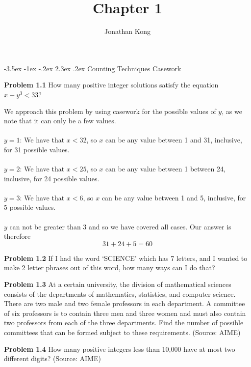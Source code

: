 \documentclass[11pt]{scrartcl}
\title{\normalfont\notesize\textbf{Chapter 1}}
\author{Jonathan Kong}
\date{}
\makeatletter
\renewcommand\section{\@startsection{section}{1}{\z@}%
                                   {-3.5ex \@plus -1ex \@minus -.2ex}%
                                   {2.3ex \@plus.2ex}%
                                   {\normalfont\large\bfseries}}
\makeatother
\begin{document}
\maketitle
\section{Counting Techniques}
Casework
\begin{tcolorbox}
\textbf{Problem 1.1} How many positive integer solutions satisfy the equation {$x+y^3<33$}?
\end{tcolorbox}
\noindent 
We approach this problem by using casework for the possible values of $y$, as we note that it can only be a few values. \\
\\
\noindent 
$y=1$: We have that $x<32$, so $x$ can be any value between 1 and 31, inclusive, for 31 possible values. \\
\\
\noindent 
$y=2$: We have that $x<25$, so $x$ can be any value between 1 between 24, inclusive, for 24 possible values. \\
\\
\noindent 
$y=3$: We have that $x<6$, so $x$ can be any value between 1 and 5, inclusive, for 5 possible values. \\
\\
\noindent 
$y$ can not be greater than 3 and so we have covered all cases. Our answer is therefore 
$$31+24+5=60$$
\begin{tcolorbox}
\textbf{Problem 1.2} If I had the word ‘SCIENCE’ which has 7 letters, and I wanted to make 2 letter phrases out of this word, how many ways can I do that? 
\end{tcolorbox}
\begin{tcolorbox}
\textbf{Problem 1.3} At a certain university, the division of mathematical sciences consists of the departments of mathematics, statistics, and computer science. There are two male and two female professors in each department. A committee of six professors is to contain three men and three women and must also contain two professors from each of the three departments. Find the number of possible committees that can be formed subject to these requirements. (Source: AIME)
\end{tcolorbox}
\begin{tcolorbox}
\textbf{Problem 1.4} How many positive integers less than 10,000 have at most two different digits? (Source: AIME)
\end{tcolorbox}
\noindent 
\end{document}
